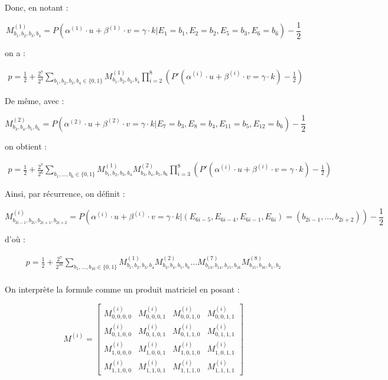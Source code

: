 \documentclass{scrartcl}
\begin{document}
Donc, en notant :

$$M^{(1)}_{b_1,b_2,b_3,b_4}=P(\alpha^{(1)}\cdot u+\beta^{(1)}\cdot v=\gamma\cdot k|E_1=b_1,E_2=b_2,E_5=b_3,E_6=b_6)-\frac{1}{2}$$

on a :

\begin{align*}
	p=\frac{1}{2}+\frac{2^7}{2^4} \sum_{b_1, b_2,b_3,b_4\in \{0,1\}} M^{(1)}_{b_1,b_2,b_3,b_4} \prod_{i=2}^8 \left(P'(\alpha^{(i)}\cdot u+\beta^{(i)}\cdot v =\gamma\cdot k)-\frac{1}{2}\right)
\end{align*}

De même, avec :

$$M^{(2)}_{b_3,b_4,b_5,b_6}=P(\alpha^{(2)}\cdot u+\beta^{(2)}\cdot v=\gamma\cdot k|E_7=b_3,E_8=b_4,E_{11}=b_5,E_{12}=b_6)-\frac{1}{2}$$

on obtient :

\begin{align*}
	p=\frac{1}{2}+\frac{2^7}{2^6} \sum_{b_1,\ldots, b_6\in \{0,1\}} M^{(1)}_{b_1,b_2,b_3,b_4} M^{(2)}_{b_3,b_4,b_5,b_6} \prod_{i=3}^8 \left(P'(\alpha^{(i)}\cdot u+\beta^{(i)}\cdot v =\gamma\cdot k)-\frac{1}{2}\right)
\end{align*}

Ainsi, par récurrence, on définit :

$$M^{(i)}_{b_{2i-1},b_{2i},b_{2i+1},b_{2i+2}}=P(\alpha^{(i)}\cdot u+\beta^{(i)}\cdot v=\gamma\cdot k|(E_{6i-5},E_{6i-4},E_{6i-1},E_{6i})=(b_{2i-1},\ldots,b_{2i+2}))-\frac{1}{2}$$

d'où :

\begin{align*}
	p=\frac{1}{2}+\frac{2^7}{2^{16}} \sum_{b_1,\ldots, b_{16}\in \{0,1\}} M^{(1)}_{b_1,b_2,b_3,b_4} M^{(2)}_{b_3,b_4,b_5,b_6}\ldots M^{(7)}_{b_{13},b_{14},b_{15},b_{16}} M^{(8)}_{b_{15},b_{16},b_1,b_2}
\end{align*}

\paragraph*{}
On interprète la formule comme un produit matriciel en posant :

$$M^{(i)}=\begin{bmatrix}
	M^{(i)}_{0,0,0,0} & M^{(i)}_{0,0,0,1} & M^{(i)}_{0,0,1,0} & M^{(i)}_{0,0,1,1}\\
	M^{(i)}_{0,1,0,0} & M^{(i)}_{0,1,0,1} & M^{(i)}_{0,1,1,0} & M^{(i)}_{0,1,1,1}\\
	M^{(i)}_{1,0,0,0} & M^{(i)}_{1,0,0,1} & M^{(i)}_{1,0,1,0} & M^{(i)}_{1,0,1,1}\\
	M^{(i)}_{1,1,0,0} & M^{(i)}_{1,1,0,1} & M^{(i)}_{1,1,1,0} & M^{(i)}_{1,1,1,1}
\end{bmatrix}$$
\end{document}
